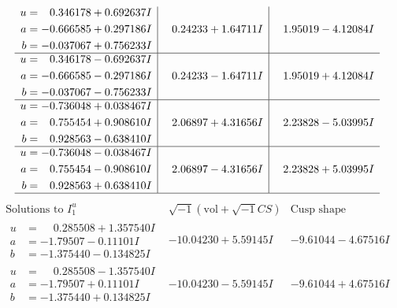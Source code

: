 \documentclass[1p]{elsarticle_modified}
\theoremstyle{definition}
\newcommand{\I}{\sqrt{-1}}
\begin{document}
$$\begin{array}{c|c|c}
\begin{aligned}
u &= \phantom{-}0.346178 + 0.692637 I \\
a &= -0.666585 + 0.297186 I \\
b &= -0.037067 + 0.756233 I\end{aligned}
 & \phantom{-}0.24233 + 1.64711 I & \phantom{-}1.95019 - 4.12084 I \\ \hline\begin{aligned}
u &= \phantom{-}0.346178 - 0.692637 I \\
a &= -0.666585 - 0.297186 I \\
b &= -0.037067 - 0.756233 I\end{aligned}
 & \phantom{-}0.24233 - 1.64711 I & \phantom{-}1.95019 + 4.12084 I \\ \hline\begin{aligned}
u &= -0.736048 + 0.038467 I \\
a &= \phantom{-}0.755454 + 0.908610 I \\
b &= \phantom{-}0.928563 - 0.638410 I\end{aligned}
 & \phantom{-}2.06897 + 4.31656 I & \phantom{-}2.23828 - 5.03995 I \\ \hline\begin{aligned}
u &= -0.736048 - 0.038467 I \\
a &= \phantom{-}0.755454 - 0.908610 I \\
b &= \phantom{-}0.928563 + 0.638410 I\end{aligned}
 & \phantom{-}2.06897 - 4.31656 I & \phantom{-}2.23828 + 5.03995 I\\
 \hline 
 \end{array}$$\newpage$$\begin{array}{c|c|c}  
\text{Solutions to }I^u_{1}& \I (\text{vol} + \sqrt{-1}CS) & \text{Cusp shape}\\
 \hline 
\begin{aligned}
u &= \phantom{-}0.285508 + 1.357540 I \\
a &= -1.79507 - 0.11101 I \\
b &= -1.375440 - 0.134825 I\end{aligned}
 & -10.04230 + 5.59145 I & -9.61044 - 4.67516 I \\ \hline\begin{aligned}
u &= \phantom{-}0.285508 - 1.357540 I \\
a &= -1.79507 + 0.11101 I \\
b &= -1.375440 + 0.134825 I\end{aligned}
 & -10.04230 - 5.59145 I & -9.61044 + 4.67516 I \\ \hline\begin{aligned}

\end{aligned}
\end{array}$$
\end{document}

